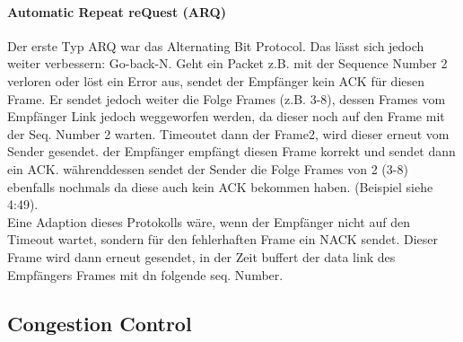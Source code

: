 		\paragraph{Automatic Repeat reQuest (ARQ)}
			Der erste Typ ARQ war das Alternating Bit Protocol. Das lässt sich jedoch weiter verbessern: Go-back-N. Geht ein Packet z.B. mit der Sequence Number 2 verloren oder löst ein Error aus, sendet der Empfänger kein ACK für diesen Frame. Er sendet jedoch weiter die Folge Frames (z.B. 3-8), dessen Frames vom Empfänger Link jedoch weggeworfen werden, da dieser noch auf den Frame mit der Seq. Number 2 warten. Timeoutet dann der Frame2, wird dieser erneut vom Sender gesendet. der Empfänger empfängt diesen Frame korrekt und sendet dann ein ACK. währenddessen sendet der Sender die Folge Frames von 2 (3-8) ebenfalls nochmals da diese auch kein ACK bekommen haben. (Beispiel siehe 4:49). \\ Eine Adaption dieses Protokolls wäre, wenn der Empfänger nicht auf den Timeout wartet, sondern für den fehlerhaften Frame ein NACK sendet. Dieser Frame wird dann erneut gesendet, in der Zeit buffert der data link des Empfängers Frames mit dn folgende seq. Number.

	\subsection{Congestion Control}
